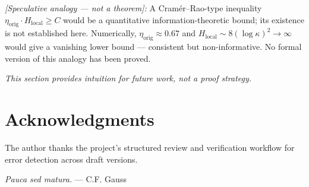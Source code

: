\documentclass[11pt]{article}
\newcommand{\etaorig}{\eta_{\mathrm{orig}}}
\begin{document}
\emph{[Speculative analogy --- not a theorem]:}
A Cram\'er--Rao-type inequality
$\etaorig\cdot H_{\mathrm{local}}\geq C$ would be a quantitative
information-theoretic bound; its existence is not established here.
Numerically, $\etaorig\approx 0.67$ and
$H_{\mathrm{local}}\sim 8(\log\kappa)^2\to\infty$ would give a
vanishing lower bound --- consistent but non-informative.
No formal version of this analogy has been proved.

\emph{This section provides intuition for future work, not a proof strategy.}

\section*{Acknowledgments}

The author thanks the project's structured review and verification
workflow for error detection across draft versions.

\emph{Pauca sed matura.} --- C.F. Gauss
\end{document}
